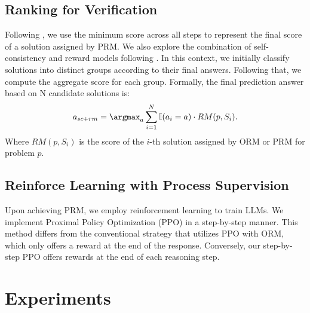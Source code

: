 \documentclass{article} %
\begin{document}
\subsection{Ranking for Verification}
Following \citep{lightman2023let}, we use the minimum score across all steps to represent the final score of a solution assigned by PRM. We also explore the combination of self-consistency and reward models following \citep{li-etal-2023-making}. In this context, we initially classify solutions into distinct groups according to their final answers. Following that, we compute the aggregate score for each group.
Formally, the final prediction answer based on N candidate solutions is:
\begin{equation}
    a_{sc+rm} = \argmax_{a} \sum_{i=1}^N \mathbb{I}(a_i = a) \cdot RM(p, S_i).
\end{equation}
Where $RM(p, S_i)$ is the score of the $i$-th solution assigned by ORM or PRM for problem $p$.


\subsection{Reinforce Learning with Process Supervision}
Upon achieving PRM, we employ reinforcement learning to train LLMs. We implement Proximal Policy Optimization (PPO) in a step-by-step manner. 
This method differs from the conventional strategy that utilizes PPO with ORM, which only offers a reward at the end of the response. Conversely, our step-by-step PPO offers rewards at the end of each reasoning step.



\section{Experiments}
\end{document}
